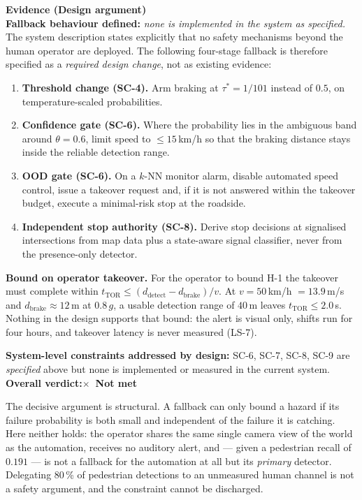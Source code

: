 \documentclass[a4paper,12pt]{article}
\makeatletter
\newcommand{\verdictnotmet}{\textbf{\color{mls@red}$\times$~Not met}}
\newcommand{\verdictline}[1]{\textbf{Overall verdict:}\quad #1}
\makeatother
\begin{document}
\begin{mdframed}[style=evidencestyle]
\textbf{Evidence (Design argument)}\\

\textbf{Fallback behaviour defined:} \emph{none is implemented in the system as
specified.} The system description states explicitly that no safety mechanisms beyond the
human operator are deployed. The following four-stage fallback is therefore specified as a
\emph{required design change}, not as existing evidence:

\begin{enumerate}[itemsep=1pt,topsep=2pt,leftmargin=*]
  \item \textbf{Threshold change (SC-4).} Arm braking at $\tau^{*}=1/101$ instead of
        $0.5$, on temperature-scaled probabilities.
  \item \textbf{Confidence gate (SC-6).} Where the probability lies in the ambiguous band
        around $\theta=0.6$, limit speed to $\leq15$\,km/h so that the braking distance
        stays inside the reliable detection range.
  \item \textbf{OOD gate (SC-6).} On a $k$-NN monitor alarm, disable automated speed
        control, issue a takeover request and, if it is not answered within the takeover
        budget, execute a minimal-risk stop at the roadside.
  \item \textbf{Independent stop authority (SC-8).} Derive stop decisions at signalised
        intersections from map data plus a state-aware signal classifier, never from the
        presence-only detector.
  \end{enumerate}

\textbf{Bound on operator takeover.} For the operator to bound H-1 the takeover must
complete within $t_{\text{TOR}} \leq (d_{\text{detect}}-d_{\text{brake}})/v$. At
$v=50$\,km/h $=13.9$\,m/s and $d_{\text{brake}}\approx12$\,m at $0.8\,g$, a usable
detection range of $40$\,m leaves $t_{\text{TOR}}\leq2.0$\,s. Nothing in the design
supports that bound: the alert is visual only, shifts run for four hours, and takeover
latency is never measured (LS-7).

\textbf{System-level constraints addressed by design:} SC-6, SC-7, SC-8, SC-9 are
\emph{specified} above but none is implemented or measured in the current system.\\

\bigskip
\verdictline{\verdictnotmet}
\end{mdframed}

\noindent The decisive argument is structural. A fallback can only bound a hazard if its
failure probability is both small and independent of the failure it is catching. Here
neither holds: the operator shares the same single camera view of the world as the
automation, receives no auditory alert, and --- given a pedestrian recall of $0.191$ --- is
not a fallback for the automation at all but its \emph{primary} detector. Delegating
80\,\% of pedestrian detections to an unmeasured human channel is not a safety argument,
and the constraint cannot be discharged.
\end{document}
